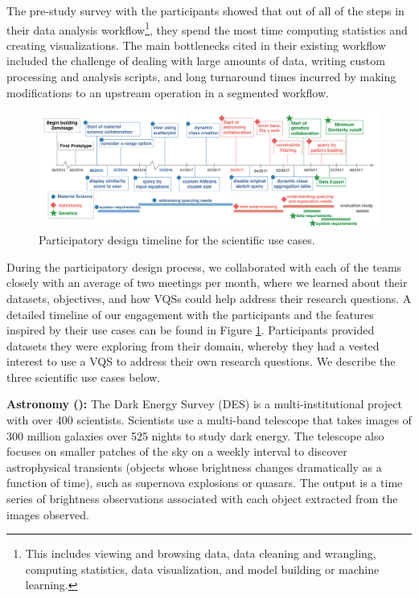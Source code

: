 \par The pre-study survey with the participants showed that out of all of the steps in their data analysis workflow\footnote{This includes viewing and browsing data, data cleaning and wrangling, computing statistics, data visualization, and model building or machine learning.}, they spend the most time computing statistics and creating visualizations.
The main bottlenecks cited in their existing workflow included the challenge of dealing with large amounts of data, writing custom processing and analysis scripts, and long turnaround times incurred by making modifications to an upstream operation in a segmented workflow. %
\begin{figure}[ht!]
\centering
\vspace{-10pt}
\includegraphics[width=6in]{figures/timeline_new.pdf}
\vspace{-6pt}\caption{Participatory design timeline for the scientific use cases.}
\label{timeline}
\vspace{-10pt}
\end{figure}
\par During the participatory design process, we collaborated with each of the teams closely with an average of two meetings per month, where we learned about their datasets, objectives, and how VQSs could help address their research questions. A detailed timeline of our engagement with the participants and the features inspired by their use cases can be found in Figure \ref{timeline}. Participants provided datasets they were exploring from their domain, whereby they had a vested interest to use a VQS to address their own research questions. We  describe the three scientific use cases below.

\par \textbf{Astronomy (\astro):} The Dark Energy Survey (DES) is a multi-institutional project with over 400 scientists. Scientists use a multi-band telescope that takes images of 300 million galaxies over 525 nights to study dark energy\cite{Drlica-Wagner2017}. The telescope also focuses on smaller patches of the sky on a weekly interval to discover astrophysical transients (objects whose brightness changes dramatically as a function of time), such as supernova explosions or quasars. The output is a time series of brightness observations associated with each object extracted from the images observed. %

